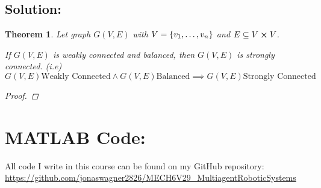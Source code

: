 \documentclass[]{article}
\numberwithin{equation}{section}
\newtheorem{theorem}{Theorem}
\begin{document}
\subsection*{Solution:}
\begin{theorem}
    Let graph $G(V,E)$ with $V = \qty{v_1,\dots,v_n}$ and $E \subseteq V \cross V$.

    If $G(V,E)$ is weakly connected and balanced, then $G(V,E)$ is strongly connected.
    (i.e)\[
        G(V,E) \text{Weakly Connected} 
            \land G(V,E) \text{Balanced}
            \implies G(V,E) \text{Strongly Connected}
    \]
    \begin{proof}
        
    \end{proof}
\end{theorem}









\newpage
\appendix
\section{MATLAB Code:}\label{apx:matlab}
All code I write in this course can be found on my GitHub repository:\\
\href{https://github.com/jonaswagner2826/MECH6V29_MultiagentRoboticSystems}{https://github.com/jonaswagner2826/MECH6V29\_MultiagentRoboticSystems}


% 
\cite{*}
\end{document}
